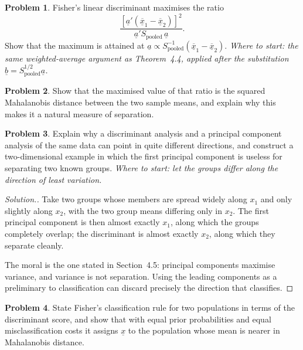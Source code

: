 \documentclass[11pt,a4paper]{article}
\theoremstyle{definition}
\newtheorem{problemx}{Problem}[section]
\newenvironment{problem}{\begin{problemx}}{\end{problemx}}
\newenvironment{solution}
  {\renewcommand{\qedsymbol}{}\begin{proof}[\textit{Solution}.]}
  {\end{proof}}
\begin{document}
\begin{problem}
Fisher's linear discriminant maximises the ratio
$$\frac{\left[\underline{a}'\left(\overline{\underline{x}}_1-\overline{\underline{x}}_2\right)\right]^{2}}
{\underline{a}'S_{\text{pooled}}\,\underline{a}}.$$
Show that the maximum is attained at
$\underline{a}\propto S_{\text{pooled}}^{-1}
\left(\overline{\underline{x}}_1-\overline{\underline{x}}_2\right)$.
\emph{Where to start: the same weighted-average argument as
Theorem~4.4, applied after the substitution
$\underline{b} = S_{\text{pooled}}^{1/2}\underline{a}$.}
\end{problem}

\begin{problem}
Show that the maximised value of that ratio is the squared Mahalanobis distance
between the two sample means, and explain why this makes it a natural measure of
separation.
\end{problem}

\begin{problem}
Explain why a discriminant analysis and a principal component analysis of the
same data can point in quite different directions, and construct a
two-dimensional example in which the first principal component is useless for
separating two known groups.
\emph{Where to start: let the groups differ along the direction of least
variation.}
\end{problem}

\begin{solution}
Take two groups whose members are spread widely along $x_1$ and only slightly
along $x_2$, with the two group means differing only in $x_2$. The first
principal component is then almost exactly $x_1$, along which the groups
completely overlap; the discriminant is almost exactly $x_2$, along which they
separate cleanly.

The moral is the one stated in Section~4.5: principal components maximise
variance, and variance is not separation. Using the leading components as a
preliminary to classification can discard precisely the direction that
classifies.
\end{solution}

\begin{problem}
State Fisher's classification rule for two populations in terms of the
discriminant score, and show that with equal prior probabilities and equal
misclassification costs it assigns $\underline{x}$ to the population whose mean
is nearer in Mahalanobis distance.
\end{problem}
\end{document}
